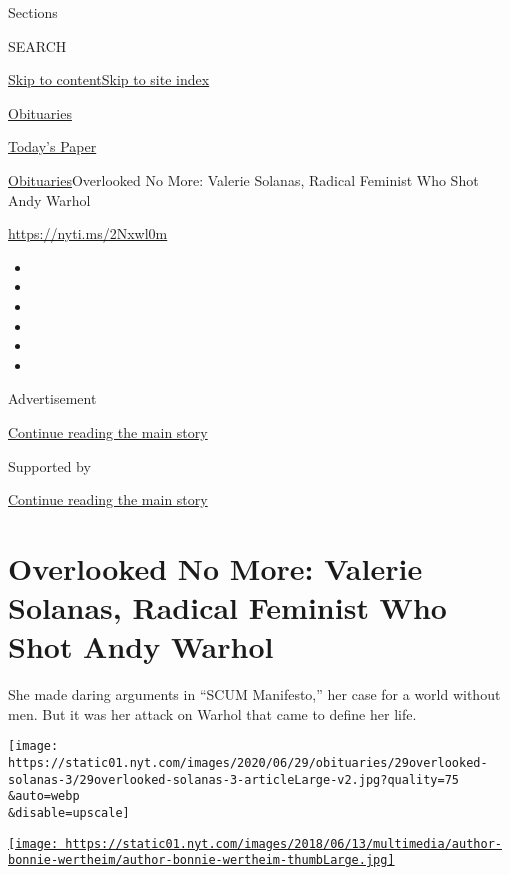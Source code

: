 Sections

SEARCH

\protect\hyperlink{site-content}{Skip to
content}\protect\hyperlink{site-index}{Skip to site index}

\href{https://www.nytimes.com/section/obituaries}{Obituaries}

\href{https://myaccount.nytimes.com/auth/login?response_type=cookie\&client_id=vi}{}

\href{https://www.nytimes.com/section/todayspaper}{Today's Paper}

\href{/section/obituaries}{Obituaries}\textbar{}Overlooked No More:
Valerie Solanas, Radical Feminist Who Shot Andy Warhol

\url{https://nyti.ms/2Nxwl0m}

\begin{itemize}
\item
\item
\item
\item
\item
\item
\end{itemize}

Advertisement

\protect\hyperlink{after-top}{Continue reading the main story}

Supported by

\protect\hyperlink{after-sponsor}{Continue reading the main story}

\hypertarget{overlooked-no-more-valerie-solanas-radical-feminist-who-shot-andy-warhol}{%
\section{Overlooked No More: Valerie Solanas, Radical Feminist Who Shot
Andy
Warhol}\label{overlooked-no-more-valerie-solanas-radical-feminist-who-shot-andy-warhol}}

She made daring arguments in ``SCUM Manifesto,'' her case for a world
without men. But it was her attack on Warhol that came to define her
life.

\texttt{[image: https://static01.nyt.com/images/2020/06/29/obituaries/29overlooked-solanas-3/29overlooked-solanas-3-articleLarge-v2.jpg?quality=75\\\&auto=webp\\\&disable=upscale]}

\href{https://www.nytimes.com/by/bonnie-wertheim}{\texttt{[image: https://static01.nyt.com/images/2018/06/13/multimedia/author-bonnie-wertheim/author-bonnie-wertheim-thumbLarge.jpg]}}

